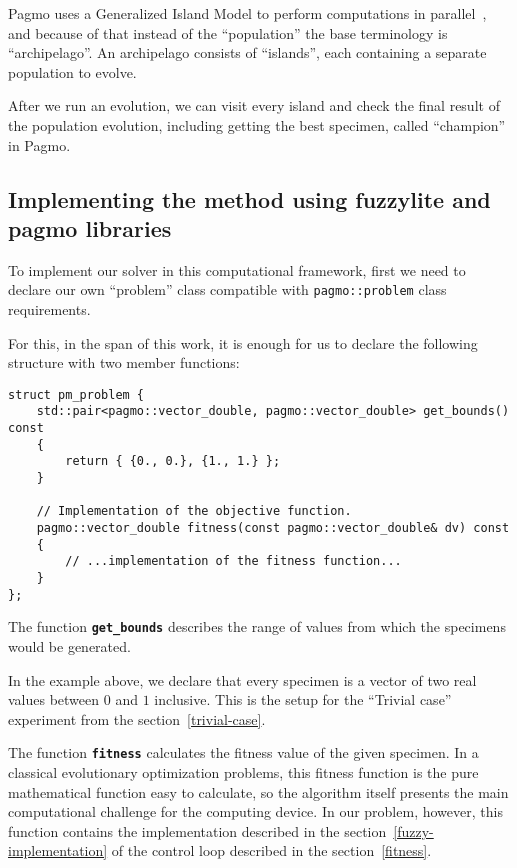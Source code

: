 \documentclass[11pt, a4paper]{article}
\begin{document}
	Pagmo uses a Generalized Island Model to perform computations in parallel~\cite{Izzo2012}, and because of that instead of the ``population'' the base terminology is ``archipelago''.
	An archipelago consists of ``islands'', each containing a separate population to evolve.
	
	After we run an evolution, we can visit every island and check the final result of the population evolution, including getting the best specimen, called ``champion'' in Pagmo.
	
	\subsection{Implementing the method using fuzzylite and pagmo libraries}
	
	To implement our solver in this computational framework, first we need to declare our own ``problem'' class compatible with \texttt{pagmo::problem} class requirements.
	
	For this, in the span of this work, it is enough for us to declare the following structure with two member functions:
	
	\begin{lstlisting}[language={[11]c++}]
struct pm_problem {
	std::pair<pagmo::vector_double, pagmo::vector_double> get_bounds() const
	{
		return { {0., 0.}, {1., 1.} };
	}
	
	// Implementation of the objective function.
	pagmo::vector_double fitness(const pagmo::vector_double& dv) const
	{
		// ...implementation of the fitness function...
	}
};
	\end{lstlisting}
	
	The function \textbf{\texttt{get\_bounds}} describes the range of values from which the specimens would be generated.
	
	In the example above, we declare that every specimen is a vector of two real values between $0$ and $1$ inclusive.
	This is the setup for the ``Trivial case'' experiment from the section~\ref{trivial-case}.
	
	The function \textbf{\texttt{fitness}} calculates the fitness value of the given specimen.
	In a classical evolutionary optimization problems, this fitness function is the pure mathematical function easy to calculate, so the algorithm itself presents the main computational challenge for the computing device.
	In our problem, however, this function contains the implementation described in the section~\ref{fuzzy-implementation} of the control loop described in the section~\ref{fitness}.
	
\end{document}
